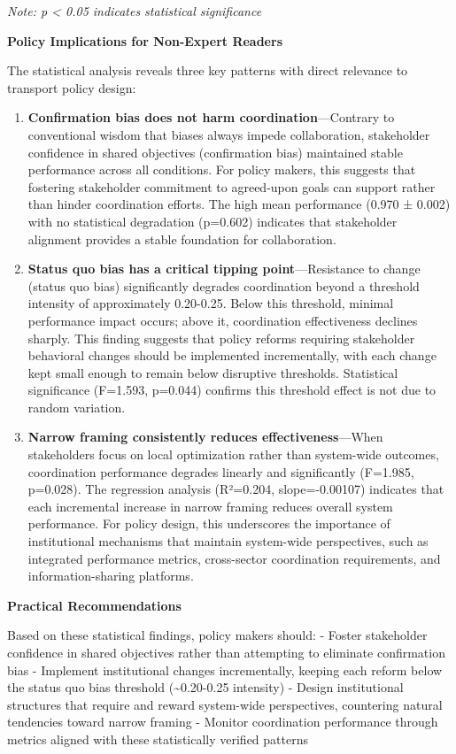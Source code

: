 \emph{Note: p \textless{} 0.05 indicates statistical significance}

\textbf{Policy Implications for Non-Expert Readers}

The statistical analysis reveals three key patterns with direct
relevance to transport policy design:

\begin{enumerate}
\def\labelenumi{\arabic{enumi}.}
\item
  \textbf{Confirmation bias does not harm coordination}---Contrary to
  conventional wisdom that biases always impede collaboration,
  stakeholder confidence in shared objectives (confirmation bias)
  maintained stable performance across all conditions. For policy
  makers, this suggests that fostering stakeholder commitment to
  agreed-upon goals can support rather than hinder coordination efforts.
  The high mean performance (0.970 ± 0.002) with no statistical
  degradation (p=0.602) indicates that stakeholder alignment provides a
  stable foundation for collaboration.
\item
  \textbf{Status quo bias has a critical tipping point}---Resistance to
  change (status quo bias) significantly degrades coordination beyond a
  threshold intensity of approximately 0.20-0.25. Below this threshold,
  minimal performance impact occurs; above it, coordination
  effectiveness declines sharply. This finding suggests that policy
  reforms requiring stakeholder behavioral changes should be implemented
  incrementally, with each change kept small enough to remain below
  disruptive thresholds. Statistical significance (F=1.593, p=0.044)
  confirms this threshold effect is not due to random variation.
\item
  \textbf{Narrow framing consistently reduces effectiveness}---When
  stakeholders focus on local optimization rather than system-wide
  outcomes, coordination performance degrades linearly and significantly
  (F=1.985, p=0.028). The regression analysis (R²=0.204, slope=-0.00107)
  indicates that each incremental increase in narrow framing reduces
  overall system performance. For policy design, this underscores the
  importance of institutional mechanisms that maintain system-wide
  perspectives, such as integrated performance metrics, cross-sector
  coordination requirements, and information-sharing platforms.
\end{enumerate}

\textbf{Practical Recommendations}

Based on these statistical findings, policy makers should: - Foster
stakeholder confidence in shared objectives rather than attempting to
eliminate confirmation bias - Implement institutional changes
incrementally, keeping each reform below the status quo bias threshold
(\textasciitilde0.20-0.25 intensity) - Design institutional structures
that require and reward system-wide perspectives, countering natural
tendencies toward narrow framing - Monitor coordination performance
through metrics aligned with these statistically verified patterns

